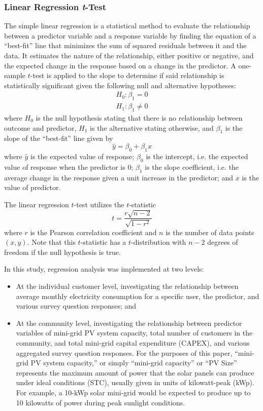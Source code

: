 \subsubsection{Linear Regression \textit{t}-Test}
\hfill \break 
The simple linear regression is a statistical method to evaluate the relationship between a predictor variable and a response variable by finding the equation of a ``best-fit'' line that minimizes the sum of squared residuals between it and the data. It estimates the nature of the relationship, either positive or negative, and the expected change in the response based on a change in the predictor. A one-sample $t$-test is applied to the slope to determine if said relationship is statistically significant given the following null and alternative hypotheses:
\begin{equation}
\begin{array}{c}
	H_0: \beta_1 = 0 \\
	H_1: \beta_1 \neq 0
\end{array}
\end{equation}
where \(H_0\) is the null hypothesis stating that there is no relationship between outcome and predictor, \(H_1\) is the alternative stating otherwise, and $\beta_1$ is the slope of the ``best-fit'' line given by
\begin{equation}
	\hat{y} = \beta_0 + \beta_1x
\end{equation}
where \(\hat{y}\) is the expected value of response; \(\beta_0\) is the intercept, i.e. the expected value of response when the predictor is 0; \(\beta_1\) is the slope coefficient, i.e. the average change in the response given a unit increase in the predictor; and $x$ is the value of predictor.

The linear regression $t$-test utilizes the $t$-statistic
\begin{equation}
	t=\frac{r\sqrt{n-2}}{\sqrt{1-r^2}}
\end{equation}
where $r$ is the Pearson correlation coefficient and $n$ is the number of data points $(x,y)$. Note that this $t$-statistic has a $t$-distribution with $n-2$ degrees of freedom if the null hypothesis is true.

In this study, regression analysis was implemented at two levels:
\begin{itemize}
	\item At the individual customer level, investigating the relationship between average monthly electricity consumption for a specific user, the predictor, and various survey question responses; and
	\item At the community level, investigating the relationship between predictor variables of mini-grid PV system capacity, total number of customers in the community, and total mini-grid capital expenditure (CAPEX), and various aggregated survey question responses. For the purposes of this paper, ``mini-grid PV system capacity,'' or simply ``mini-grid capacity'' or ``PV Size'' represents the maximum amount of power that the solar panels can produce under ideal conditions (STC), usually given in units of kilowatt-peak (kWp). For example, a 10-kWp solar mini-grid would be expected to produce up to 10 kilowatts of power during peak sunlight conditions.
\end{itemize}

